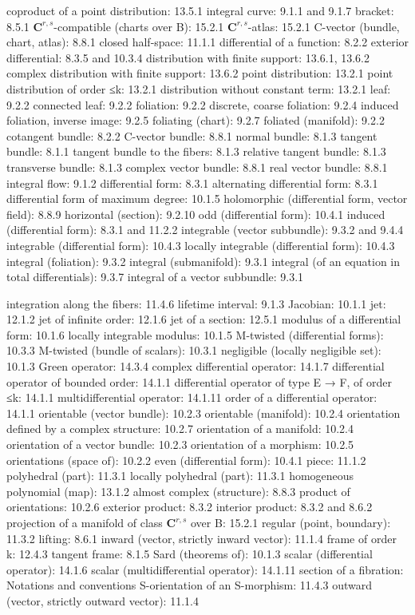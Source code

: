 coproduct of a point distribution: 13.5.1 integral curve: 9.1.1 and 9.1.7 bracket: 8.5.1 \(\mathbf{C}^{r,s}\)-compatible (charts over B): 15.2.1 \(\mathbf{C}^{r,s}\)-atlas: 15.2.1 C-vector (bundle, chart, atlas): 8.8.1 closed half-space: 11.1.1 differential of a function: 8.2.2 exterior differential: 8.3.5 and 10.3.4 distribution with finite support: 13.6.1, 13.6.2 complex distribution with finite support: 13.6.2 point distribution: 13.2.1 point distribution of order ≤k: 13.2.1 distribution without constant term: 13.2.1 leaf: 9.2.2 connected leaf: 9.2.2 foliation: 9.2.2 discrete, coarse foliation: 9.2.4 induced foliation, inverse image: 9.2.5 foliating (chart): 9.2.7 foliated (manifold): 9.2.2 cotangent bundle: 8.2.2 C-vector bundle: 8.8.1 normal bundle: 8.1.3 tangent bundle: 8.1.1 tangent bundle to the fibers: 8.1.3 relative tangent bundle: 8.1.3 transverse bundle: 8.1.3 complex vector bundle: 8.8.1 real vector bundle: 8.8.1 integral flow: 9.1.2 differential form: 8.3.1 alternating differential form: 8.3.1 differential form of maximum degree: 10.1.5 holomorphic (differential form, vector field): 8.8.9 horizontal (section): 9.2.10 odd (differential form): 10.4.1 induced (differential form): 8.3.1 and 11.2.2 integrable (vector subbundle): 9.3.2 and 9.4.4 integrable (differential form): 10.4.3 locally integrable (differential form): 10.4.3 integral (foliation): 9.3.2 integral (submanifold): 9.3.1 integral (of an equation in total differentials): 9.3.7 integral of a vector subbundle: 9.3.1

integration along the fibers: 11.4.6 lifetime interval: 9.1.3 Jacobian: 10.1.1 jet: 12.1.2 jet of infinite order: 12.1.6 jet of a section: 12.5.1 modulus of a differential form: 10.1.6 locally integrable modulus: 10.1.5 M-twisted (differential forms): 10.3.3 M-twisted (bundle of scalars): 10.3.1 negligible (locally negligible set): 10.1.3 Green operator: 14.3.4 complex differential operator: 14.1.7 differential operator of bounded order: 14.1.1 differential operator of type E → F, of order ≤k: 14.1.1 multidifferential operator: 14.1.11 order of a differential operator: 14.1.1 orientable (vector bundle): 10.2.3 orientable (manifold): 10.2.4 orientation defined by a complex structure: 10.2.7 orientation of a manifold: 10.2.4 orientation of a vector bundle: 10.2.3 orientation of a morphism: 10.2.5 orientations (space of): 10.2.2 even (differential form): 10.4.1 piece: 11.1.2 polyhedral (part): 11.3.1 locally polyhedral (part): 11.3.1 homogeneous polynomial (map): 13.1.2 almost complex (structure): 8.8.3 product of orientations: 10.2.6 exterior product: 8.3.2 interior product: 8.3.2 and 8.6.2 projection of a manifold of class \(\mathbf{C}^{r,s}\) over B: 15.2.1 regular (point, boundary): 11.3.2 lifting: 8.6.1 inward (vector, strictly inward vector): 11.1.4 frame of order k: 12.4.3 tangent frame: 8.1.5 Sard (theorems of): 10.1.3 scalar (differential operator): 14.1.6 scalar (multidifferential operator): 14.1.11 section of a fibration: Notations and conventions S-orientation of an S-morphism: 11.4.3 outward (vector, strictly outward vector): 11.1.4

